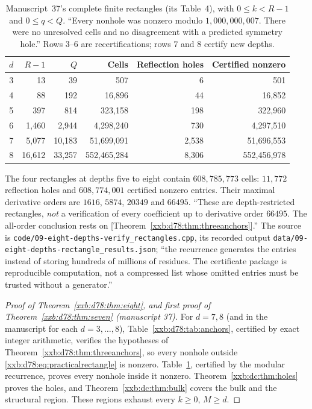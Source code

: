 \documentclass[11pt,a4paper]{article}
\numberwithin{equation}{section}
\theoremstyle{definition}
\theoremstyle{remark}
\theoremstyle{plain}
\begin{document}
\begingroup
\renewcommand{\thetable}{\thesection.E}%
\renewcommand{\theHtable}{xxb.d78.\thesection.E}%
\begin{table}[!htbp]
\centering\small
\begin{tabular}{@{}rrrrrr@{}}
\toprule
$d$ & $R-1$ & $Q$ & Cells & Reflection holes & Certified nonzero\\
\midrule
3 & 13 & 39 & 507 & 6 & 501\\
4 & 88 & 192 & 16,896 & 44 & 16,852\\
5 & 397 & 814 & 323,158 & 198 & 322,960\\
6 & 1,460 & 2,944 & 4,298,240 & 730 & 4,297,510\\
7 & 5,077 & 10,183 & 51,699,091 & 2,538 & 51,696,553\\
8 & 16,612 & 33,257 & 552,465,284 & 8,306 & 552,456,978\\
\bottomrule
\end{tabular}
\caption{Manuscript~37's complete finite rectangles (its Table~4), with
$0\le k<R-1$ and $0\le q<Q$.  ``Every nonhole was nonzero modulo
$1,000,000,007$. There were no unresolved cells and no disagreement with a
predicted symmetry hole.''  Rows $3$--$6$ are recertifications; rows $7$
and $8$ certify new depths.}\label{xxb:d78:tab:rectangles}
\end{table}
\endgroup
\addtocounter{table}{-1}

The four rectangles at depths five to eight contain $608{,}785{,}773$ cells:
$11{,}772$ reflection holes and $608{,}774{,}001$ certified nonzero entries.
Their maximal derivative orders are $1616$, $5874$, $20349$ and $66495$.
``These are depth-restricted rectangles, \emph{not} a verification of every
coefficient up to derivative order $66495$. The all-order conclusion rests on
[Theorem~\ref{xxb:d78:thm:threeanchors}].''  The source is
\texttt{code/09-eight-\allowbreak depths-\allowbreak verify\_rectangles.cpp},
its recorded output
\texttt{data/09-eight-\allowbreak depths-\allowbreak rectangle\_results.json};
``the recurrence generates the entries instead of storing hundreds of
millions of residues. The certificate package is reproducible computation,
not a compressed list whose omitted entries must be trusted without a
generator.''

\begin{proof}[Proof of Theorem~\ref{xxb:d78:thm:eight}, and first proof of Theorem~\ref{xxb:d78:thm:seven} (manuscript 37)]
For $d=7,8$ (and in the manuscript for each $d=3,\ldots,8$),
Table~\ref{xxb:d78:tab:anchors}, certified by exact integer arithmetic,
verifies the hypotheses of Theorem~\ref{xxb:d78:thm:threeanchors}, so every
nonhole outside \eqref{xxb:d78:eq:practicalrectangle} is nonzero.
Table~\ref{xxb:d78:tab:rectangles}, certified by the modular recurrence,
proves every nonhole inside it nonzero.  Theorem~\ref{xxb:dc:thm:holes}
proves the holes, and Theorem~\ref{xxb:dc:thm:bulk} covers the bulk and the
structural region.  These regions exhaust every $k\ge0$, $M\ge d$.
\end{proof}
\end{document}
